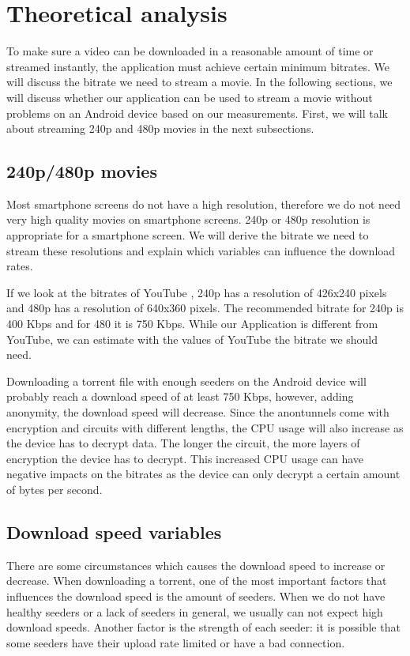 \section{Theoretical analysis}
	To make sure a video can be downloaded in a reasonable amount of time or streamed instantly, the application must achieve certain minimum bitrates. We will discuss the bitrate we need to stream a movie. In the following sections, we will discuss whether our application can be used to stream a movie without problems on an Android device based on our measurements. First, we will talk about streaming 240p and 480p movies in the next subsections.
	
	\subsection{240p/480p movies}
		Most smartphone screens do not have a high resolution, therefore we do not need very high quality movies on smartphone screens. 240p or 480p resolution is appropriate for a smartphone screen. We will derive the bitrate we need to stream these resolutions and explain which variables can influence the download rates.
		
		If we look at the bitrates of YouTube \cite{googlebitrates}, 240p has a resolution of 426x240 pixels and 480p has a resolution of 640x360 pixels. The recommended bitrate for 240p is 400 Kbps and for 480 it is 750 Kbps. While our Application is different from YouTube, we can estimate with the values of YouTube the bitrate we should need.
		
		Downloading a torrent file with enough seeders on the Android device will probably reach a download speed of at least 750 Kbps, however, adding anonymity, the download speed will decrease. Since the anontunnels come with  encryption and circuits with different lengths, the CPU usage will also increase as the device has to decrypt data. The longer the circuit, the more layers of encryption the device has to decrypt. This increased CPU usage
		can have negative impacts on the bitrates as the device can only decrypt a certain amount of bytes per second.
		
	\subsection{Download speed variables}
		There are some circumstances which causes the download speed to increase or decrease. When downloading a torrent, one of the most important factors that influences the download speed is the amount of seeders. When we do not have healthy seeders or a lack of seeders in general, we usually can not expect high download speeds. Another factor is the strength of each seeder: it is possible that some seeders have their upload rate limited or have a bad connection.
		
